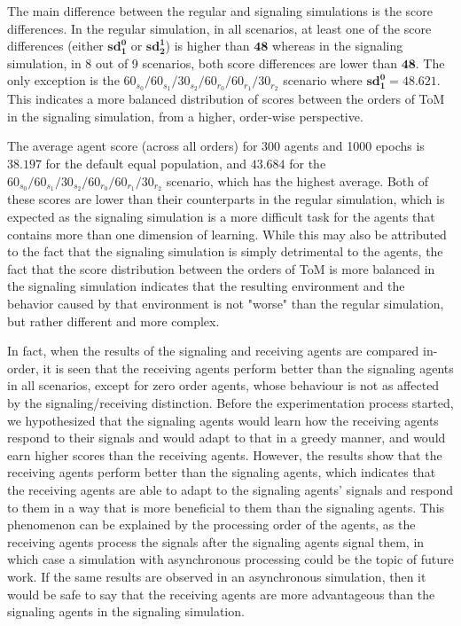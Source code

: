 The main difference between the regular and signaling simulations is the score differences. In the regular simulation, in all scenarios, at least one of the score differences (either $\mathbf{sd^0_1}$ or $\mathbf{sd^1_2}$) is higher than $\mathbf{48}$ whereas in the signaling simulation, in 8 out of 9 scenarios, both score differences are lower than $\mathbf{48}$. The only exception is the $60_{s_{0}}/60_{s_{1}}/30_{s_{2}}/60_{r_{0}}/60_{r_{1}}/30_{r_{2}}$ scenario where $\mathbf{sd^0_1 = 48.621}$. This indicates a more balanced distribution of scores between the orders of ToM in the signaling simulation, from a higher, order-wise perspective.

The average agent score (across all orders) for 300 agents and 1000 epochs is $\mathbf{38.197}$ for the default equal population, and $\mathbf{43.684}$ for the $60_{s_{0}}/60_{s_{1}}/30_{s_{2}}/60_{r_{0}}/60_{r_{1}}/30_{r_{2}}$ scenario, which has the highest average. Both of these scores are lower than their counterparts in the regular simulation, which is expected as the signaling simulation is a more difficult task for the agents that contains more than one dimension of learning. While this may also be attributed to the fact that the signaling simulation is simply detrimental to the agents, the fact that the score distribution between the orders of ToM is more balanced in the signaling simulation indicates that the resulting environment and the behavior caused by that environment is not "worse" than the regular simulation, but rather different and more complex.

In fact, when the results of the signaling and receiving agents are compared in-order, it is seen that the receiving agents perform better than the signaling agents in all scenarios, except for zero order agents, whose behaviour is not as affected by the signaling/receiving distinction. Before the experimentation process started, we hypothesized that the signaling agents would learn how the receiving agents respond to their signals and would adapt to that in a greedy manner, and would earn higher scores than the receiving agents. However, the results show that the receiving agents perform better than the signaling agents, which indicates that the receiving agents are able to adapt to the signaling agents' signals and respond to them in a way that is more beneficial to them than the signaling agents. This phenomenon can be explained by the processing order of the agents, as the receiving agents process the signals after the signaling agents signal them, in which case a simulation with asynchronous processing could be the topic of future work. If the same results are observed in an asynchronous simulation, then it would be safe to say that the receiving agents are more advantageous than the signaling agents in the signaling simulation.

